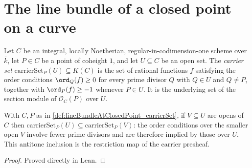 \section{The line bundle of a closed point on a curve}


\begin{definition}
  \label{def:lineBundleAtClosedPoint_carrierSet}
  Let \(C\) be an integral, locally Noetherian, regular-in-codimension-one
  scheme over \(\bar k\), let \(P \in C\) be a point of coheight \(1\), and
  let \(U \subseteq C\) be an open set. The \emph{carrier set}
  \(\mathrm{carrierSet}_P(U) \subseteq K(C)\) is the set of rational
  functions \(f\) satisfying the order conditions \(\ord_Q(f) \ge 0\) for
  every prime divisor \(Q\) with \(Q \in U\) and \(Q \ne P\), together with
  \(\ord_P(f) \ge -1\) whenever \(P \in U\). It is the underlying set of the
  section module of \(\mathcal O_C(P)\) over \(U\).
\end{definition}

\begin{lemma}
  \label{lem:lineBundleAtClosedPoint_carrierSet_mono}
  With \(C, P\) as in \cref{def:lineBundleAtClosedPoint_carrierSet}, if
  \(V \subseteq U\) are opens of \(C\) then
  \(\mathrm{carrierSet}_P(U) \subseteq \mathrm{carrierSet}_P(V)\): the order
  conditions over the smaller open \(V\) involve fewer prime divisors and are
  therefore implied by those over \(U\). This antitone inclusion is the
  restriction map of the carrier presheaf.
\end{lemma}

\begin{proof} Proved directly in Lean. \end{proof}

